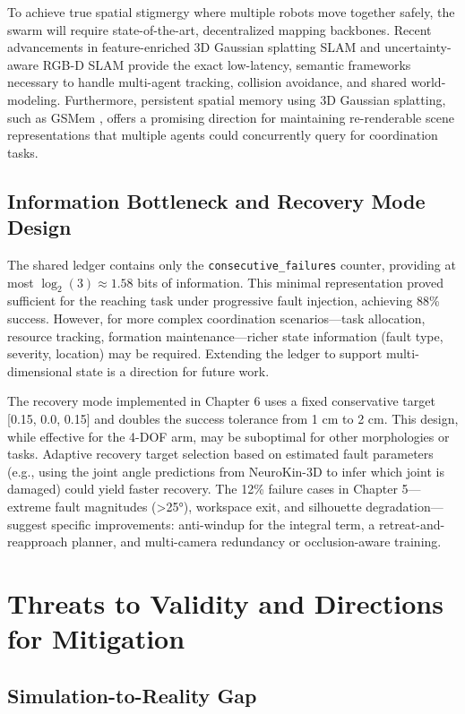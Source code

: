 \documentclass[12pt,a4paper,oneside]{report}
\begin{document}
To achieve true spatial stigmergy where multiple robots move together safely, the swarm will require state-of-the-art, decentralized mapping backbones. Recent advancements in feature-enriched 3D Gaussian splatting SLAM \cite{thirgood2025featureslam} and uncertainty-aware RGB-D SLAM \cite{tran2025varsplat} provide the exact low-latency, semantic frameworks necessary to handle multi-agent tracking, collision avoidance, and shared world-modeling. Furthermore, persistent spatial memory using 3D Gaussian splatting, such as GSMem \cite{lu2025gsmem}, offers a promising direction for maintaining re-renderable scene representations that multiple agents could concurrently query for coordination tasks.

\subsection{Information Bottleneck and Recovery Mode Design}

The shared ledger contains only the \texttt{consecutive\_failures} counter, providing at most $\log_2(3) \approx 1.58$ bits of information. This minimal representation proved sufficient for the reaching task under progressive fault injection, achieving 88\% success. However, for more complex coordination scenarios—task allocation, resource tracking, formation maintenance—richer state information (fault type, severity, location) may be required. Extending the ledger to support multi-dimensional state is a direction for future work.

The recovery mode implemented in Chapter 6 uses a fixed conservative target [0.15, 0.0, 0.15] and doubles the success tolerance from 1 cm to 2 cm. This design, while effective for the 4-DOF arm, may be suboptimal for other morphologies or tasks. Adaptive recovery target selection based on estimated fault parameters (e.g., using the joint angle predictions from NeuroKin-3D to infer which joint is damaged) could yield faster recovery. The 12\% failure cases in Chapter 5—extreme fault magnitudes (>25°), workspace exit, and silhouette degradation—suggest specific improvements: anti-windup for the integral term, a retreat-and-reapproach planner, and multi-camera redundancy or occlusion-aware training.

\section{Threats to Validity and Directions for Mitigation}

\subsection{Simulation-to-Reality Gap}
\end{document}
